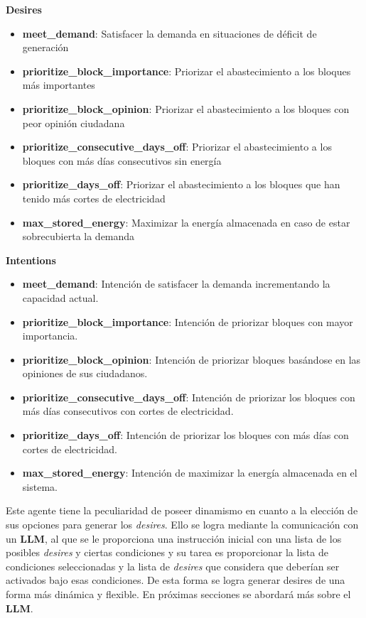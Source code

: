\documentclass[twocolumn, fontsize=10pt]{article}
\begin{document}
\textbf{Desires}

\begin{itemize}
  \item \textbf{meet\_demand}: Satisfacer la demanda en situaciones de déficit de generación
  \item \textbf{prioritize\_block\_importance}: Priorizar el abastecimiento a los bloques más importantes
  \item \textbf{prioritize\_block\_opinion}: Priorizar el abastecimiento a los bloques con peor opinión ciudadana
  \item \textbf{prioritize\_consecutive\_days\_off}: Priorizar el abastecimiento a los bloques con más días consecutivos sin energía
  \item \textbf{prioritize\_days\_off}: Priorizar el abastecimiento a los bloques que han tenido más cortes de electricidad
  \item \textbf{max\_stored\_energy}: Maximizar la energía almacenada en caso de estar sobrecubierta la demanda
\end{itemize}
\textbf{Intentions}

\begin{itemize}
  \item \textbf{meet\_demand}: Intención de satisfacer la demanda incrementando la capacidad actual.
  \item \textbf{prioritize\_block\_importance}: Intención de priorizar bloques con mayor importancia.
  \item \textbf{prioritize\_block\_opinion}: Intención de priorizar bloques basándose en las opiniones de sus ciudadanos.
  \item \textbf{prioritize\_consecutive\_days\_off}: Intención de priorizar los bloques con más días consecutivos con cortes de electricidad.
  \item \textbf{prioritize\_days\_off}: Intención de priorizar los bloques con más días con cortes de electricidad.
  \item \textbf{max\_stored\_energy}:  Intención de maximizar la energía almacenada en el sistema.
\end{itemize}

Este agente tiene la peculiaridad de poseer dinamismo en cuanto a la elección de sus opciones
para generar los \textit{desires}. Ello se logra mediante la comunicación con un \textbf{LLM}, al que se le proporciona una instrucción inicial con una lista de los
posibles \textit{desires} y ciertas condiciones y su tarea es proporcionar la lista de condiciones seleccionadas y la lista de \textit{desires} que considera que deberían ser activados
bajo esas condiciones. De esta forma se logra generar desires de una forma más dinámica y flexible. En próximas secciones se abordará más sobre el \textbf{LLM}.
\end{document}
